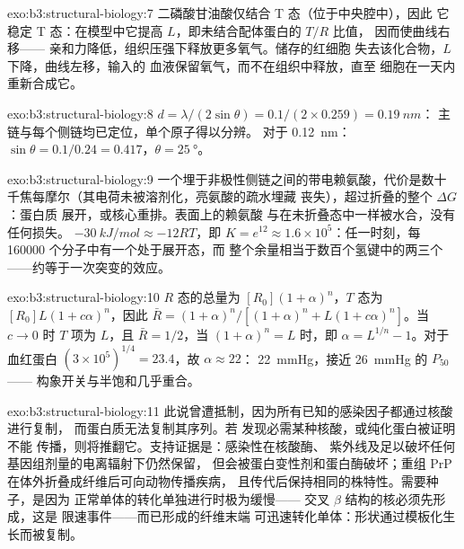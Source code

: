 \begin{solution}{exo:b3:structural-biology:7}
二磷酸甘油酸仅结合 T 态（位于中央腔中），因此
它稳定 T 态：在模型中它提高 $L$，即未结合配体蛋白的 $T/R$ 比值，
因而使曲线右移——
亲和力降低，组织压强下释放更多氧气。储存的红细胞
失去该化合物，$L$ 下降，曲线左移，输入的
血液保留氧气，而不在组织中释放，直至
细胞在一天内重新合成它。
\end{solution}

\begin{solution}{exo:b3:structural-biology:8}
$d = \lambda/(2\sin\theta) = 0.1/(2\times 0.259) = \qty{0.19}{nm}$：
主链与每个侧链均已定位，单个原子得以分辨。
对于 \qty{0.12}{nm}：$\sin\theta = 0.1/0.24 = 0.417$，$\theta =
\qty{25}{\degree}$。
\end{solution}

\begin{solution}{exo:b3:structural-biology:9}
一个埋于非极性侧链之间的带电赖氨酸，代价是数十
千焦每摩尔（其电荷未被溶剂化，亮氨酸的疏水埋藏
丧失），超过折叠的整个 $\Delta G$：蛋白质
展开，或核心重排。表面上的赖氨酸
与在未折叠态中一样被水合，没有任何损失。
$\qty{-30}{kJ/mol} \approx -12RT$，即 $K = e^{12} \approx 1.6\times
10^{5}$：任一时刻，每 \num{160000} 个分子中有一个处于展开态，而
整个余量相当于数百个氢键中的两三个
——约等于一次突变的效应。
\end{solution}

\begin{solution}{exo:b3:structural-biology:10}
$R$ 态的总量为 $[R_{0}](1+\alpha)^{n}$，$T$ 态为
$[R_{0}]L(1+c\alpha)^{n}$，因此 $\bar R = (1+\alpha)^{n}/[(1+\alpha)^{n}
+ L(1+c\alpha)^{n}]$。当 $c \to 0$ 时 $T$ 项为 $L$，且 $\bar R =
1/2$，当 $(1+\alpha)^{n} = L$ 时，即 $\alpha = L^{1/n} - 1$。对于
血红蛋白 $(3\times 10^{5})^{1/4} = 23.4$，故 $\alpha \approx 22$：
\qty{22}{mmHg}，接近 \qty{26}{mmHg} 的 $P_{50}$——
构象开关与半饱和几乎重合。
\end{solution}

\begin{solution}{exo:b3:structural-biology:11}
此说曾遭抵制，因为所有已知的感染因子都通过核酸进行复制，
而蛋白质无法复制其序列。若
发现必需某种核酸，或纯化蛋白被证明不能
传播，则将推翻它。支持证据是：感染性在核酸酶、
紫外线及足以破坏任何基因组剂量的电离辐射下仍然保留，
但会被蛋白变性剂和蛋白酶破坏；重组
PrP 在体外折叠成纤维后可向动物传播疾病，
且传代后保持相同的株特性。需要种子，是因为
正常单体的转化单独进行时极为缓慢——
交叉 $\beta$ 结构的核必须先形成，这是
限速事件——而已形成的纤维末端
可迅速转化单体：形状通过模板化生长而被复制。
\end{solution}

